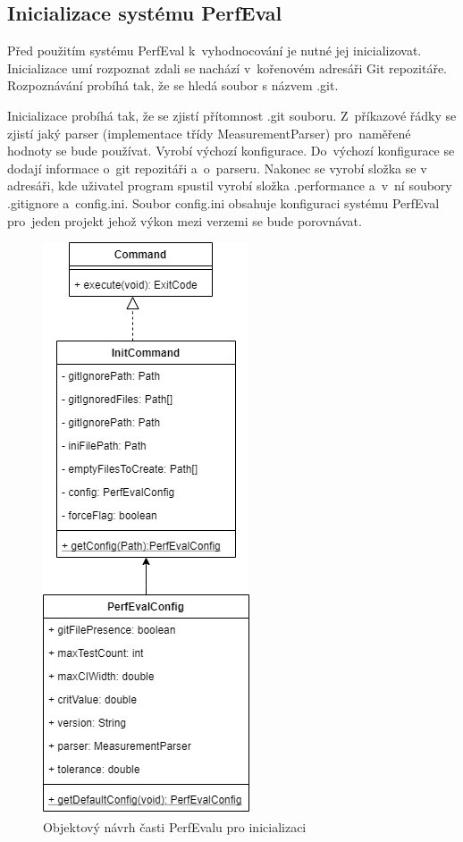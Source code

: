 \subsection{Inicializace systému PerfEval}

Před použitím systému PerfEval k~vyhodnocování je nutné jej inicializovat. Inicializace umí rozpoznat zdali se nachází
v~kořenovém adresáři Git repozitáře. Rozpoznávání probíhá tak, že se hledá soubor s názvem .git.

Inicializace probíhá tak, že se zjistí přítomnost .git souboru. Z~příkazové řádky se zjistí jaký parser (implementace
třídy MeasurementParser) pro~naměřené hodnoty se bude používat. Vyrobí výchozí konfigurace. Do~výchozí konfigurace
se dodají informace o~git repozitáři a~o~parseru. Nakonec se vyrobí složka se v adresáři, kde uživatel program spustil
vyrobí složka .performance a~v~ní soubory .gitignore a~config.ini. Soubor config.ini obsahuje konfiguraci systému PerfEval
pro~jeden projekt jehož výkon mezi verzemi se bude porovnávat.

\begin{figure}[!ht]
    \centering
    \includegraphics[height=0.5\textheight]{../img/perfeval_init.png}
    \caption{Objektový návrh časti PerfEvalu pro inicializaci}
\end{figure}


